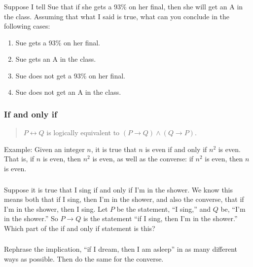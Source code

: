 \documentclass[11pt, compress]{beamer}
\renewcommand{\iff}{\leftrightarrow}
\newcommand{\imp}{\rightarrow}
\begin{document}
\begin{frame}
\frametitle{}
\begin{example}[0.2.6]Suppose I tell Sue that if she gets a 93\% on her final, then she will get an A in the class. Assuming that what I said is true, what can you conclude in the following cases:
\begin{enumerate}
\item{} Sue gets a 93\% on her final.


\item{} Sue gets an A in the class.


\item{} Sue does not get a 93\% on her final.


\item{} Sue does not get an A in the class.

\end{enumerate}

\end{example}
\end{frame}
 
\begin{frame}
\frametitle{If and only if}
 \begin{quote}%
\(P \iff Q\) is logically equivalent to \((P \imp Q) \wedge (Q \imp P)\).
\end{quote}
 
\pause 

Example: Given an integer \(n\), it is true that \(n\) is even if and only if \(n^2\) is even. That is, if \(n\) is even, then \(n^2\) is even, as well as the converse: if \(n^2\) is even, then \(n\) is even.
\end{frame}
 
\begin{frame}
\frametitle{}
\begin{example}[0.2.7]Suppose it is true that I sing if and only if I'm in the shower. We know this means both that if I sing, then I'm in the shower, and also the converse, that if I'm in the shower, then I sing. Let \(P\) be the statement, ``I sing,'' and \(Q\) be, ``I'm in the shower.'' So \(P \imp Q\) is the statement ``if I sing, then I'm in the shower.'' Which part of the if and only if statement is this?
\end{example}
\end{frame}
 
\begin{frame}
\frametitle{}
\begin{example}[0.2.8]Rephrase the implication, ``if I dream, then I am asleep'' in as many different ways as possible. Then do the same for the converse.
\end{example}
\end{frame}
 
\end{document}
